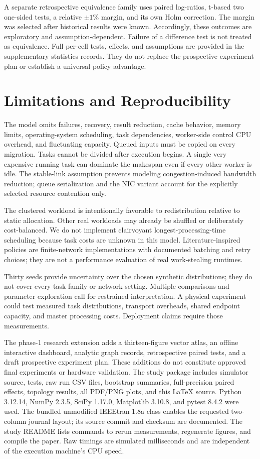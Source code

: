 \documentclass[10pt,journal,twocolumn]{IEEEtran}
\begin{document}
A separate retrospective equivalence family uses paired log-ratios, t-based two one-sided tests, a relative $\pm1\%$ margin, and its own Holm correction. The margin was selected after historical results were known. Accordingly, these outcomes are exploratory and assumption-dependent. Failure of a difference test is not treated as equivalence. Full per-cell tests, effects, and assumptions are provided in the supplementary statistics records. They do not replace the prospective experiment plan or establish a universal policy advantage.

\section{Limitations and Reproducibility}
The model omits failures, recovery, result reduction, cache behavior, memory limits, operating-system scheduling, task dependencies, worker-side control CPU overhead, and fluctuating capacity. Queued inputs must be copied on every migration. Tasks cannot be divided after execution begins. A single very expensive running task can dominate the makespan even if every other worker is idle. The stable-link assumption prevents modeling congestion-induced bandwidth reduction; queue serialization and the NIC variant account for the explicitly selected resource contention only.

The clustered workload is intentionally favorable to redistribution relative to static allocation. Other real workloads may already be shuffled or deliberately cost-balanced. We do not implement clairvoyant longest-processing-time scheduling because task costs are unknown in this model. Literature-inspired policies are finite-network implementations with documented batching and retry choices; they are not a performance evaluation of real work-stealing runtimes.

Thirty seeds provide uncertainty over the chosen synthetic distributions; they do not cover every task family or network setting. Multiple comparisons and parameter exploration call for restrained interpretation. A physical experiment could test measured task distributions, transport overheads, shared endpoint capacity, and master processing costs. Deployment claims require those measurements.

The phase-1 research extension adds a thirteen-figure vector atlas, an offline interactive dashboard, analytic graph records, retrospective paired tests, and a draft prospective experiment plan. These additions do not constitute approved final experiments or hardware validation. The study package includes simulator source,  tests, raw run CSV files, bootstrap summaries, full-precision paired effects, topology results, all PDF/PNG plots, and this LaTeX source. Python 3.12.14, NumPy 2.3.5, SciPy 1.17.0, Matplotlib 3.10.8, and pytest 8.4.2 were used. The bundled unmodified IEEEtran 1.8a class enables the requested two-column journal layout; its source commit and checksum are documented. The study README lists commands to rerun measurements, regenerate figures, and compile the paper. Raw timings are simulated milliseconds and are independent of the execution machine's CPU speed.
\end{document}
